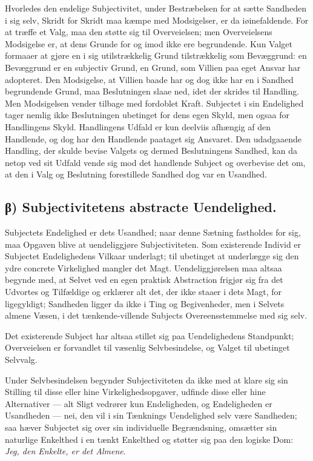 \documentclass[12pt]{book}
\newcommand{\opage}[1]{\marginnote{\footnotesize\textit{[#1]}}}
\begin{document}
Hvorledes den endelige Subjectivitet, under Bestræbelsen for at
sætte Sandheden i sig selv, Skridt for Skridt maa kæmpe med
Modsigelser, er da iøinefaldende. For at træffe et Valg, maa den
støtte sig til Overveielsen; men Overveielsens Modsigelse er, at
dens Grunde for og imod ikke ere begrundende. Kun Valget formaaer at
gjøre en i sig utilstrækkelig Grund tilstrækkelig som Bevæggrund: en
Bevæggrund er en subjectiv Grund, en Grund, som Villien paa eget
Ansvar har adopteret. Den Modsigelse, at Villien baade har og dog
ikke har en i Sandhed begrundende Grund, maa Beslutningen slaae ned,
idet der skrides til Handling. Men Modsigelsen vender tilbage med
fordoblet Kraft. Subjectet i sin Endelighed tager nemlig ikke
Beslutningen ubetinget for dens egen Skyld, men ogsaa for
Handlingens Skyld. Handlingens Udfald er kun deelviis afhængig af
den Handlende, og dog har den Handlende paataget sig Ansvaret. Den
udadgaaende Handling, der skulde bevise Valgets og dermed
Beslutningens Sandhed, kan da netop ved sit Udfald vende
\opage{54} sig mod det handlende Subject og overbevise det om, at den i Valg og
Beslutning forestillede Sandhed dog var en Usandhed.

\subsection*{β) Subjectivitetens abstracte Uendelighed.}

Subjectets Endelighed er dets Usandhed; naar denne Sætning
fastholdes for sig, maa Opgaven blive at uendeliggjøre
Subjectiviteten. Som existerende Individ er Subjectet Endelighedens
Vilkaar underlagt; til ubetinget at underlægge sig den ydre concrete
Virkelighed mangler det Magt. Uendeliggjørelsen maa altsaa begynde
med, at Selvet ved en egen praktisk Abstraction frigjør sig fra det
Udvortes og Tilfældige og erklærer alt det, der ikke staaer i dets
Magt, for ligegyldigt; Sandheden ligger da ikke i Ting og
Begivenheder, men i Selvets almene Væsen, i det tænkende-villende
Subjects Overeensstemmelse med sig selv.

Det existerende Subject har altsaa stillet sig paa Uendelighedens
Standpunkt; Overveielsen er forvandlet til væsenlig Selvbesindelse,
og Valget til ubetinget Selvvalg.

Under Selvbesindelsen begynder Subjectiviteten da ikke med at klare
sig sin Stilling til disse eller hine Virkelighedsopgaver, udfinde
disse eller hine Alternativer --- alt Sligt vedrører kun
Endeligheden, og Endeligheden er Usandheden --- nei, den vil i sin
Tænknings Uendelighed selv være Sandheden; saa hæver Subjectet sig
over sin individuelle Begrændsning, omsætter sin naturlige Enkelthed
i en tænkt Enkelthed og støtter sig paa den logiske Dom: \emph{Jeg,
den Enkelte, er det Almene}.
\end{document}
